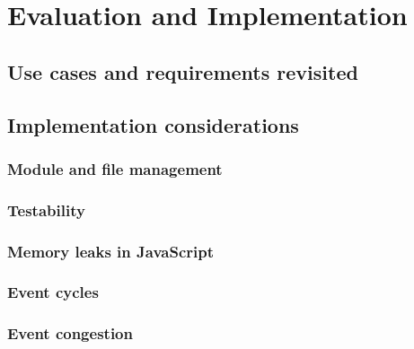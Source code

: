 \chapter{Evaluation and Implementation}

\section{Use cases and requirements revisited}

\section{Implementation considerations}

\subsection{Module and file management}
\subsection{Testability}
\subsection{Memory leaks in JavaScript}
\subsection{Event cycles}
\subsection{Event congestion}